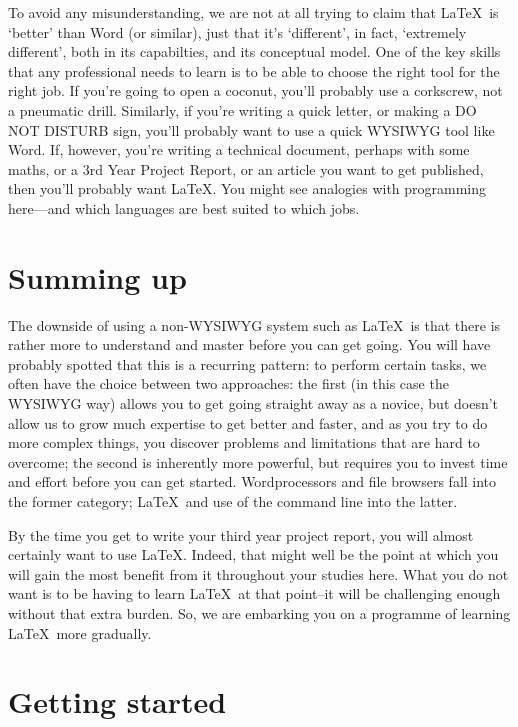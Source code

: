 \begin{refsection}
To avoid any  misunderstanding, we are not at all trying to claim that \LaTeX\ is `better' than Word (or similar), just that it's `different', in fact, `extremely different', both in its capabilties, and its conceptual model. One of the key skills that any professional needs to learn is to be able to choose the right tool for the right job. If you're going to open a coconut, you'll probably use a corkscrew, not a pneumatic drill. Similarly, if you're writing a quick letter, or making a DO NOT DISTURB sign, you'll probably want to use a quick WYSIWYG tool like Word. If, however, you're writing a technical document, perhaps with some maths, or a 3rd Year Project Report, or an article you want to get published, then you'll probably want \LaTeX.  You might see analogies with programming here---and which languages are best suited to which jobs.

\section{Summing up}
\label{section:getting-started}
The downside of using a non-WYSIWYG system such as \LaTeX\ is that there is rather more to understand and master before you can get going. You will have probably spotted that this is a recurring pattern: to perform certain tasks, we often have the choice between two approaches: the first (in this case the WYSIWYG way) allows you to get going straight away as a novice, but doesn't allow us to grow much expertise to get better and faster, and as you try to do more complex things, you discover problems and limitations that are hard to overcome; the second is inherently more powerful, but requires you to invest time and effort before you can get started. Wordprocessors and file browsers fall into the former category; \LaTeX\ and use of the command line into the latter.

By the time you get to write your third year project report, you will almost certainly want to use \LaTeX. Indeed, that might well be the point at which you will gain the most benefit from it throughout your studies here. What you do not want is to be having to learn \LaTeX\ at that point--it will be challenging enough without that extra burden. So, we are embarking you on a programme of learning \LaTeX\ more gradually.


\section{Getting started}



\end{refsection}
